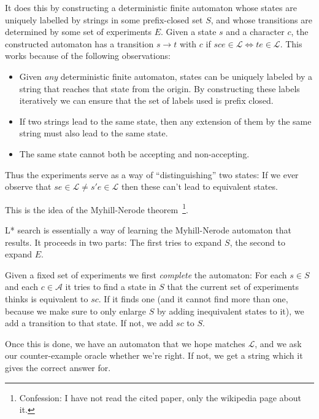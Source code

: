\documentclass[a4paper]{book}
\begin{document}
It does this by constructing a deterministic finite automaton whose states are uniquely labelled by strings in some prefix-closed set \(S\),
and whose transitions are determined by some set of experiments \(E\).
Given a state \(s\) and a character \(c\),
the constructed automaton has a transition \(s \to t\) with \(c\) if \(sce \in \mathcal{L} \iff te \in \mathcal{L}\).
This works because of the following observations:

\begin{itemize}
\item Given \emph{any} deterministic finite automaton,
states can be uniquely labeled by a string that reaches that state from the origin.
By constructing these labels iteratively we can ensure that the set of labels used is prefix closed.
\item If two strings lead to the same state,
then any extension of them by the same string must also lead to the same state.
\item The same state cannot both be accepting and non-accepting.
\end{itemize}

Thus the experiments serve as a way of ``distinguishing'' two states:
If we ever observe that \(se \in \mathcal{L} \neq s'e \in \mathcal{L}\) then these can't lead to equivalent states.

This is the idea of the Myhill-Nerode theorem~\cite{nerode1958linear}\footnote{Confession:
I have not read the cited paper,
only the wikipedia page about it.
}.

L* search is essentially a way of learning the Myhill-Nerode automaton that results.
It proceeds in two parts:
The first tries to expand \(S\),
the second to expand \(E\).

Given a fixed set of experiments we first \emph{complete} the automaton:
For each \(s \in S\) and each \(c \in \mathcal{A}\) it tries to find a state in \(S\) that the current set of experiments thinks is equivalent to \(sc\).
If it finds one (and it cannot find more than one,
because we make sure to only enlarge \(S\) by adding inequivalent states to it),
we add a transition to that state.
If not,
we add \(sc\) to \(S\).

Once this is done,
we have an automaton that we hope matches \(\mathcal{L}\),
and we ask our counter-example oracle whether we're right.
If not,
we get a string which it gives the correct answer for.
\end{document}
